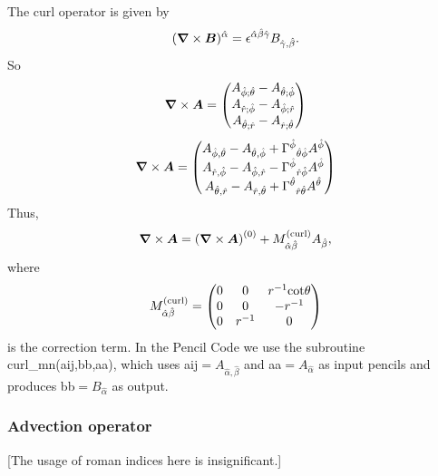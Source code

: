 \documentclass[\mydriver,12pt,twoside,notitlepage,a4paper]{article}
\renewcommand{\vec}[1]{\mbox{\boldmath{$#1$}}}
\newcommand{\Av}            {\vec{A}}
\newcommand{\Bv}            {\vec{B}}
\newcommand{\uv}            {\vec{u}}
\newcommand{\nab}{\mbox{\boldmath $\nabla$} {}}
\begin{document}
The curl operator is given by
\begin{equation}
(\nab\times\Bv)^{\hat\alpha}
=\epsilon^{\hat\alpha\hat\beta\hat\gamma}B_{\hat\gamma,\hat\beta}.
\end{equation}
So
\begin{equation}
\nab\times\Av=
\begin{pmatrix}
A_{\hat\phi;\hat\theta}-A_{\hat\theta;\hat\phi}\cr
A_{\hat r;\hat\phi}-A_{\hat\phi;\hat r}\cr
A_{\hat\theta;\hat r}-A_{\hat r;\hat\theta}
\end{pmatrix}
\end{equation}
\begin{equation}
\nab\times\Av=
\begin{pmatrix}
A_{\hat\phi,\hat\theta}-A_{\hat\theta,\hat\phi}
  +{\Gamma^{\hat\phi}}_{\hat\theta\hat\phi}A^{\hat\phi}\cr
A_{\hat r,\hat\phi}-A_{\hat\phi,\hat r}
  -{\Gamma^{\hat\phi}}_{\hat r\hat\phi}A^{\hat\phi}\cr
A_{\hat\theta,\hat r}-A_{\hat r,\hat\theta}
  +{\Gamma^{\hat\theta}}_{\hat r\hat\theta}A^{\hat\theta}
\end{pmatrix}
\end{equation}
Thus,
\begin{equation}
\nab\times\Av=\left(\nab\times\Av\right)^{(0)}
+M^{\rm(curl)}_{\hat\alpha\hat\beta}A_{\hat\beta},
\end{equation}
where
\begin{equation}
M^{\rm(curl)}_{\hat\alpha\hat\beta}=
\begin{pmatrix}
0 & 0 & r^{-1}\!\cot\!\theta\cr 0 & 0 & -r^{-1}\cr 0 & r^{-1} & 0\cr
\end{pmatrix}
\end{equation}
is the correction term.
In the {\sc Pencil Code} we use the subroutine {\sf curl\_mn(aij,bb,aa)},
which uses {\sf aij}$=A_{\hat\alpha,\hat\beta}$ and {\sf aa}$=A_{\hat\alpha}$
as input pencils and produces {\sf bb}$=B_{\hat\alpha}$ as output.

\subsubsection{Advection operator}

[The usage of roman indices here is insignificant.]
\end{document}
